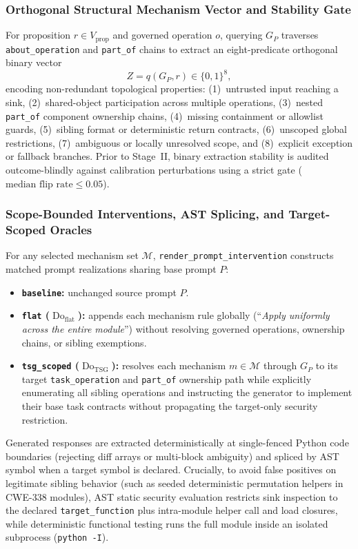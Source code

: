 \subsubsection{Orthogonal Structural Mechanism Vector and Stability Gate}
For proposition $r \in V_{\mathrm{prop}}$ and governed operation $o$, querying
$G_P$ traverses \texttt{about\_operation} and \texttt{part\_of} chains to
extract an eight-predicate orthogonal binary vector
\begin{equation}
  Z = q(G_P, r) \in \{0,1\}^8,
  \label{eq:attribute-query}
\end{equation}
encoding non-redundant topological properties: (1)~untrusted input reaching a
sink, (2)~shared-object participation across multiple operations, (3)~nested
\texttt{part\_of} component ownership chains, (4)~missing containment or
allowlist guards, (5)~sibling format or deterministic return contracts,
(6)~unscoped global restrictions, (7)~ambiguous or locally unresolved scope, and
(8)~explicit exception or fallback branches. Prior to Stage~II, binary
extraction stability is audited outcome-blindly against calibration
perturbations using a strict gate ($\text{median flip rate} \le 0.05$).

\subsubsection{Scope-Bounded Interventions, AST Splicing, and Target-Scoped Oracles}
For any selected mechanism set $\mathcal{M}$, \texttt{render\_prompt\_intervention}
constructs matched prompt realizations sharing base prompt $P$:
\begin{itemize}
  \item \textbf{\texttt{baseline}:} unchanged source prompt $P$.
  \item \textbf{\texttt{flat} ($\operatorname{Do}_{\mathrm{flat}}$):} appends
  each mechanism rule globally (``\emph{Apply uniformly across the entire module}'')
  without resolving governed operations, ownership chains, or sibling exemptions.
  \item \textbf{\texttt{tsg\_scoped} ($\operatorname{Do}_{\mathrm{TSG}}$):}
  resolves each mechanism $m \in \mathcal{M}$ through $G_P$ to its target
  \texttt{task\_operation} and \texttt{part\_of} ownership path while explicitly
  enumerating all sibling operations and instructing the generator to implement
  their base task contracts without propagating the target-only security
  restriction.
\end{itemize}
Generated responses are extracted deterministically at single-fenced Python code
boundaries (rejecting diff arrays or multi-block ambiguity) and spliced by AST
symbol when a target symbol is declared. Crucially, to avoid false positives on
legitimate sibling behavior (such as seeded deterministic permutation helpers in
CWE-338 modules), AST static security evaluation restricts sink inspection to
the declared \texttt{target\_function} plus intra-module helper call and load
closures, while deterministic functional testing runs the full module inside an
isolated subprocess (\texttt{python -I}).

